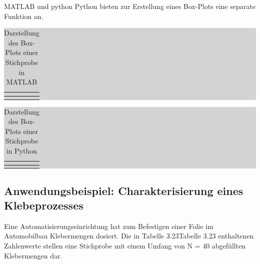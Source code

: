 \noindent MATLAB und python Python bieten zur Erstellung eines Box-Plots eine separate Funktion an.

\begin{table}[H]
\setlength{\arrayrulewidth}{.1em}
\caption{Darstellung des Box-Plots einer Stichprobe in MATLAB}
\setlength{\fboxsep}{0pt}%
\colorbox{lightgray}{%
%
\begin{tabular}{| c | c |}
\hline
\parbox[c][0.3in][c]{3.3in}{\smallskip\centering\textbf{\selectfont{Darstellung}}} & 
\parbox[c][0.3in][c]{3.3in}{\smallskip\centering\textbf{\selectfont{MATLAB-Befehl}}}\\ \hline

\parbox[c][0.3in][c]{3.3in}{\centering{}\selectfont{Box-Plot}} & 
\parbox[c][0.3in][c]{3.3in}{\centering{}\selectfont{boxplot(x)}}\\ \hline

\end{tabular}%
}
\label{tab:threetwentyone}
\end{table}

\begin{table}[H]
\setlength{\arrayrulewidth}{.1em}
\caption{Darstellung des Box-Plots einer Stichprobe in Python}
\setlength{\fboxsep}{0pt}%
\colorbox{lightgray}{%
%
\begin{tabular}{| c | c |}
\hline
\parbox[c][0.3in][c]{3.3in}{\smallskip\centering\textbf{\selectfont{Darstellung}}} & 
\parbox[c][0.3in][c]{3.3in}{\smallskip\centering\textbf{\selectfont{MATLAB-Befehl}}}\\ \hline

\parbox[c][0.3in][c]{3.3in}{\centering{}\selectfont{Box-Plot}} & 
\parbox[c][0.3in][c]{3.3in}{\centering{}\selectfont{matplotlib.pyplot.boxplot}}\\ \hline

\end{tabular}%
}
\label{tab:threetwentytwo}
\end{table}

\clearpage

\subsection{Anwendungsbeispiel: Charakterisierung eines Klebeprozesses}

\noindent Eine Automatisierungseinrichtung hat zum Befestigen einer Folie im Automobilbau Klebermengen dosiert. Die in Tabelle 3.23Tabelle 3.23 enthaltenen Zahlenwerte stellen eine Stichprobe mit einem Umfang von N = 40 abgef\"{u}llten Klebermengen dar. 

